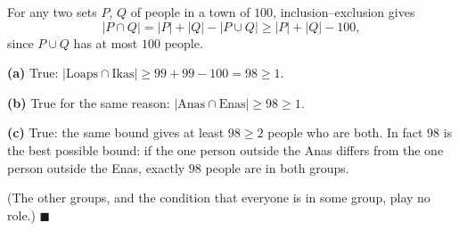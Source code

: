 For any two sets $P$, $Q$ of people in a town of $100$, inclusion--exclusion gives
\[
|P\cap Q|=|P|+|Q|-|P\cup Q|\ge|P|+|Q|-100 ,
\]
since $P\cup Q$ has at most $100$ people.

\textbf{(a)} True: $|\text{Loaps}\cap\text{Ikas}|\ge99+99-100=98\ge1$.

\textbf{(b)} True for the same reason: $|\text{Anas}\cap\text{Enas}|\ge98\ge1$.

\textbf{(c)} True: the same bound gives at least $98\ge2$ people who are both. In fact $98$ is the best possible bound: if the one person outside the Anas differs from the one person outside the Enas, exactly $98$ people are in both groups.

(The other groups, and the condition that everyone is in some group, play no role.) $\blacksquare$
